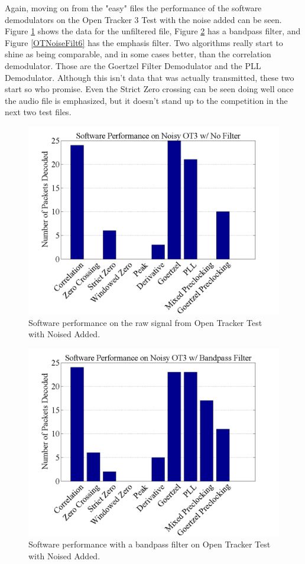 Again, moving on from the "easy" files the performance of the software demodulators on the Open Tracker 3 Test with the noise added can be seen. Figure \ref{OTNoiseFiltNo} shows the data for the unfiltered file, Figure \ref{OTNoiseFilt0} has a bandpass filter, and Figure \ref{OTNoiseFilt6} has the emphasis filter. Two algorithms really start to shine as being comparable, and in some cases better, than the correlation demodulator. Those are the Goertzel Filter Demodulator and the PLL Demodulator. Although this isn't data that was actually transmitted, these two start so who promise. Even the Strict Zero crossing can be seen doing well once the audio file is emphasized, but it doesn't stand up to the competition in the next two test files.

\begin{figure}
  \centering
	\includegraphics[width=0.75\linewidth]{images/SoftwarePerformanceonNoisyOT3wNoFilter.png} 
	\caption{Software performance on the raw signal from Open Tracker Test with Noised Added.}
   \label{OTNoiseFiltNo}
\end{figure}
\begin{figure}
  \centering
	\includegraphics[width=0.75\linewidth]{images/SoftwarePerformanceonNoisyOT3wBandpassFilter.png} 
	\caption{Software performance with a bandpass filter on Open Tracker Test with Noised Added.}
   \label{OTNoiseFilt0}
\end{figure}
